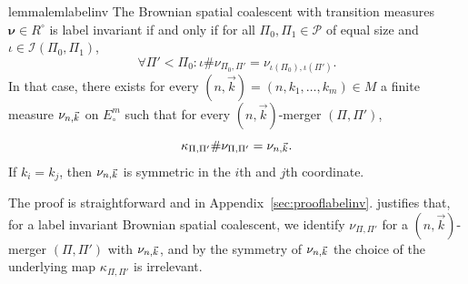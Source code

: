 \documentclass[reqno,draft]{amsart}
\numberwithin{equation}{section}
\theoremstyle{plain}
\newtheorem{lemma}[theorem]{Lemma}
\theoremstyle{remark}
\newcommand{\fpart}{\Pi} %
\newcommand{\rates}{R^\circ} %
\newcommand{\mergers}{M}
\newcommand{\nkmap}{\kappa} %
\newcommand{\labelinv}{\mathcal{I}} %
\newcommand{\nunk}{\nu_{n,\smash{\vec{k}}}}
\begin{document}
\begin{restatable}{lemma}{lemlabelinv}\label{lem:labelinv}
    The Brownian spatial coalescent with transition measures $\boldsymbol \nu\in \rates$ is label invariant if and only if for all $\fpart_0,\fpart_1\in \mathcal{P}$ of equal size and $\iota \in \labelinv(\fpart_0,\fpart_1)$, \[
        \forall \fpart' < \fpart_0\colon  \iota \# \nu_{\fpart_0,\fpart'} = \nu_{\iota(\fpart_0),\iota(\fpart')}.
    \]  %
    In that case, there exists for every $(n,\vec{k}) = (n,k_1, \ldots ,k_m) \in \mergers$ a finite measure $\nunk$ on $E^m_\circ $ such that for every $(n,\vec{k})$-merger $(\fpart,\fpart')$, \[
        \nkmap_{\fpart,\fpart'} \# \nu_{\fpart,\fpart'} = \nunk.
    \] If $k_i = k_j$, then $\nunk$ is symmetric in the $i$th and $j$th coordinate.
\end{restatable}

The proof is straightforward and in Appendix~\ref{sec:prooflabelinv}.  justifies that, for a label invariant Brownian spatial coalescent, we identify $\nu_{\fpart,\fpart'}$ for a $(n,\vec{k})$-merger $(\fpart,\fpart')$ with $\nunk$, and by the symmetry of $\nunk$ the choice of the underlying map $\kappa_{\fpart,\fpart'}$ is irrelevant.
\end{document}
